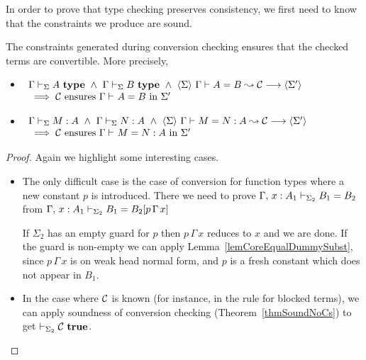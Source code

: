 In order to prove that type checking preserves consistency, we first need to
know that the constraints we produce are sound.

\begin{lemma} \label{lemSoundConstraints}
    The constraints generated during conversion checking ensures that the
    checked terms are convertible.
    More precisely,
    \begin{itemize}
	\item \( \begin{array}[t]{l}
		    \IsTypeCS \Sigma \Gamma A
		    ~ \wedge ~ \IsTypeCS \Sigma \Gamma B
		    ~ \wedge ~ \ExplicitJudgement \Sigma {\EqualType A B \Cs} {\Sigma'}
		    \\ {} \implies \mbox{$\Cs$ ensures $\EqualTypeC \Gamma A B$ in $\Sigma'$}
	      \end{array} \)
	\item \( \begin{array}[t]{l}
		    \HasTypeCS \Sigma \Gamma M A
		    ~ \wedge ~ \HasTypeCS \Sigma \Gamma N A
		    ~ \wedge ~ \ExplicitJudgement \Sigma {\Equal M N A \Cs} {\Sigma'}
		    \\ {} \implies \mbox{$\Cs$ ensures $\EqualC \Gamma M N A$ in $\Sigma'$}
	      \end{array} \)
    \end{itemize}
\end{lemma}

\begin{proof}
    Again we highlight some interesting cases.
    \begin{itemize}
	\item 
	
	The only difficult case is the case of conversion for function types
	where a new constant $p$ is introduced. There we need to prove
	$\EqualTypeCS {\Sigma_2} {\Ext \Gamma x : A_1} {B_1} {B_2}$ from
	$\EqualTypeCS {\Sigma_2} {\Ext \Gamma x : A_1} {B_1} {\SubstD {B_2} {p
	\, \Gamma \, x}}$

	If $\Sigma_2$ has an empty guard for $p$ then $p \, \Gamma \, x$
	reduces to $x$ and we are done. If the guard is non-empty we can apply
	Lemma~\ref{lemCoreEqualDummySubst}, since $p \, \Gamma \, x$ is on weak
	head normal form, and $p$ is a fresh constant which does not appear in
	$B_1$.

	\item In the case where $\Cs$ is known (for instance, in the rule for
	blocked terms), we can apply soundness of conversion checking
	(Theorem~\ref{thmSoundNoCs}) to get $\TrueConstr {\Sigma_2} \Cs$.

    \end{itemize}
\end{proof}

